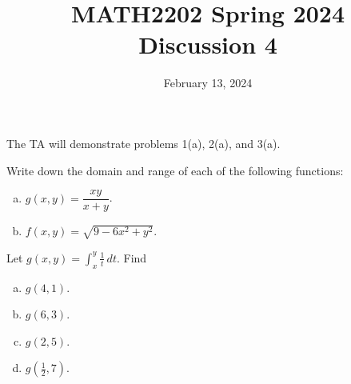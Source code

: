 \documentclass[11pt,oneside]{amsart}
\title{MATH2202 Spring 2024\\
Discussion 4}
\date{February 13, 2024}
\theoremstyle{definition}
\begin{document}
  \maketitle

  The TA will demonstrate problems 1(a), 2(a), and 3(a).

  \begin{problem}
    Write down the domain and range of each of the following functions:
    \begin{enumerate}[(a)]
        \item $g(x,y)=\dfrac{xy}{x+y}$.
        \item $f(x,y)=\sqrt{9-6x^2+y^2}$.
    \end{enumerate}
  \end{problem}

  \begin{problem}
    Let $g(x,y)=\displaystyle\int_x^y\frac 1t\,dt$. Find
    \begin{enumerate}[(a)]
        \item $g(4,1)$.
        \item $g(6,3)$.
        \item $g(2,5)$.
        \item $g(\frac12,7)$.
    \end{enumerate}
  \end{problem}
\end{document}
